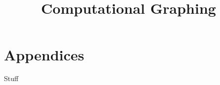 \documentclass[12pt]{memoir}
\title{Computational Graphing}
\begin{document}
    \newcommand{\documentname}{System Requirements Specification}
    
    \newpage

	\tableofcontents

	\newpage
    	
	

	\newpage
	
	\newpage
	
	\newpage
	\section{Appendices}
	Stuff
\end{document}

